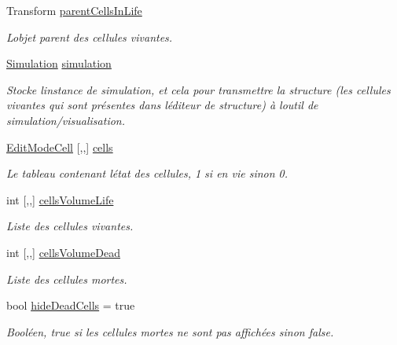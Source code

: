 \begin{DoxyCompactItemize}
Transform \mbox{\hyperlink{class_edit_mode_manager_a73637bcfc94b5701b5bab079a93aaaad}{parent\+Cells\+In\+Life}}
\begin{DoxyCompactList}\small\item\em L\textquotesingle{}objet parent des cellules vivantes. \end{DoxyCompactList}\item 
\mbox{\hyperlink{class_simulation}{Simulation}} \mbox{\hyperlink{class_edit_mode_manager_a1fd101cae685f8113863a24df8b9ee8f}{simulation}}
\begin{DoxyCompactList}\small\item\em Stocke l\textquotesingle{}instance de simulation, et cela pour transmettre la structure (les cellules vivantes qui sont présentes dans l\textquotesingle{}éditeur de structure) à l\textquotesingle{}outil de simulation/visualisation. \end{DoxyCompactList}\item 
\mbox{\hyperlink{class_edit_mode_cell}{Edit\+Mode\+Cell}} \mbox{[},,\mbox{]} \mbox{\hyperlink{class_edit_mode_manager_a7dedb1b0edf13150eb522730203f773e}{cells}}
\begin{DoxyCompactList}\small\item\em Le tableau contenant l\textquotesingle{}état des cellules, 1 si en vie sinon 0. \end{DoxyCompactList}\item 
int \mbox{[},,\mbox{]} \mbox{\hyperlink{class_edit_mode_manager_ae9b25aaa4594dd5296b2e8190b7ff303}{cells\+Volume\+Life}}
\begin{DoxyCompactList}\small\item\em Liste des cellules vivantes. \end{DoxyCompactList}\item 
int \mbox{[},,\mbox{]} \mbox{\hyperlink{class_edit_mode_manager_a2f9d02aaf0d440c6ab0f9b73e3fec5e6}{cells\+Volume\+Dead}}
\begin{DoxyCompactList}\small\item\em Liste des cellules mortes. \end{DoxyCompactList}\item 
bool \mbox{\hyperlink{class_edit_mode_manager_a2ad2ba7ae4c1faa2444b397f587f8adf}{hide\+Dead\+Cells}} = true
\begin{DoxyCompactList}\small\item\em Booléen, true si les cellules mortes ne sont pas affichées sinon false. \end{DoxyCompactList}\item 

\end{DoxyCompactItemize}
